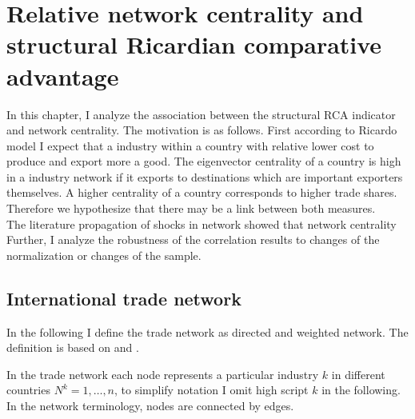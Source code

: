 \chapter{Relative network centrality and structural Ricardian comparative advantage}
In this chapter, I analyze the association between the structural RCA indicator and network centrality. The motivation is as follows.
First according to Ricardo model  I expect that a industry within a country with relative lower cost to produce and export more a good.
The eigenvector centrality  of a country is high in a industry network if it exports to destinations which are important exporters themselves.
 A higher centrality of a country corresponds to higher trade shares.
 Therefore we hypothesize that there may be a link between both measures. \\
The literature propagation of shocks in network  \cite{acemoglu2012} showed that network centrality
Further, I analyze the robustness of the correlation results to changes of the normalization or changes of the sample.
\section{International trade network}
In the following I define the trade network as directed and weighted network. The definition is based on \textcite{jackson2010} and \textcite{de2010}.\par
In the trade network each node represents a particular industry $k$ in different countries $N^k = 1, \dots , n$, to simplify notation I omit high script $k$ in the following.
In the network terminology, nodes are connected by edges.


